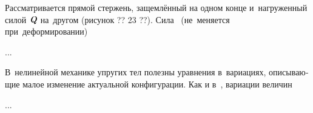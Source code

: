 

\begin{otherlanguage}{russian}

Рассматривается прямой стержень, защемлённый на одном конце и~нагруженный силой~$\mathboldQ$ на~другом (рисунок ?? 23 ??). Сила ~(не~меняется при~деформировании)

...



\end{otherlanguage}



\begin{otherlanguage}{russian}

В~нелинейной механике упругих тел полезны уравнения в~вариациях, описывающие малое изменение актуальной конфигурации. Как и в~, вариации величин

...



\end{otherlanguage}



